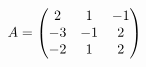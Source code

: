 \documentclass[preview]{standalone}
\begin{document}
\begin{align*}
\special{dvisvgm:raw <g id='unique000'>}A = \begin{pmatrix} 2 & 1 & -1 \\ -3 & -1 & 2 \\ -2 & 1 & 2 \end{pmatrix}\special{dvisvgm:raw </g>}
\end{align*}
\end{document}
